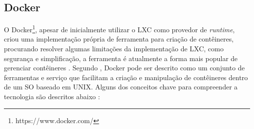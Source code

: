 \documentclass[twoside,english,brazilian]{UNISINOSartigo}
\begin{document}

\subsection{Docker}
\label{docker}

O Docker\footnote{https://www.docker.com/}, apesar de inicialmente utilizar o LXC como provedor de \textit{runtime}, criou uma implementação própria de ferramenta para criação de contêineres, procurando resolver algumas limitações da implementação de LXC, como segurança e simplificação, a ferramenta é atualmente a forma mais popular de gerenciar contêineres \cite{Pahl2015}. Segundo \cite{NICKOLOFF2016}, Docker pode ser descrito como um conjunto de ferramentas e serviço que facilitam a criação e manipulação de contêineres dentro de um SO baseado em UNIX.
Alguns dos conceitos chave para compreender a tecnologia são descritos abaixo \cite{whitepaperDocker2016}:  
\end{document}

